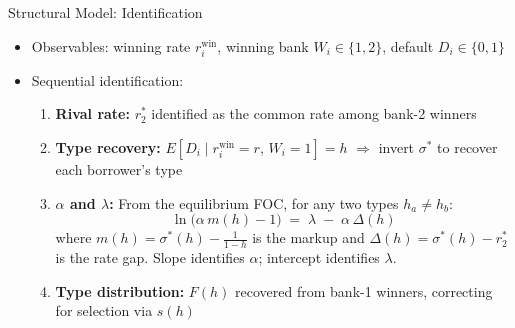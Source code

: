 \documentclass[10pt,aspectratio=169]{beamer}
\begin{document}
\begin{frame}{Structural Model: Identification}
\begin{itemize}
    \item Observables: winning rate $r_i^{\text{win}}$, winning bank $W_i \in \{1,2\}$, default $D_i \in \{0,1\}$
    \item Sequential identification:
    \begin{enumerate}
        \item \textbf{Rival rate:} $r_2^*$ identified as the common rate among bank-2 winners
        \item \textbf{Type recovery:} $E[D_i \mid r_i^{\text{win}} = r,\, W_i = 1] = h$ \; $\Rightarrow$ invert $\sigma^*$ to recover each borrower's type    
        \item \textbf{$\alpha$ and $\lambda$:} From the equilibrium FOC, for any two types $h_a \neq h_b$:
        $$\ln\!\big(\alpha\, m(h) - 1\big) \;=\; \lambda \;-\; \alpha\,\Delta(h)$$
        where $m(h) = \sigma^*(h) - \tfrac{1}{1-h}$ is the markup and $\Delta(h) = \sigma^*(h) - r_2^*$ is the rate gap. Slope identifies $\alpha$; intercept identifies $\lambda$.
    \item \textbf{Type distribution:} $F(h)$ recovered from bank-1 winners, correcting for selection via $s(h)$
\end{enumerate}
\end{itemize}
\end{frame}


 
\end{document}
